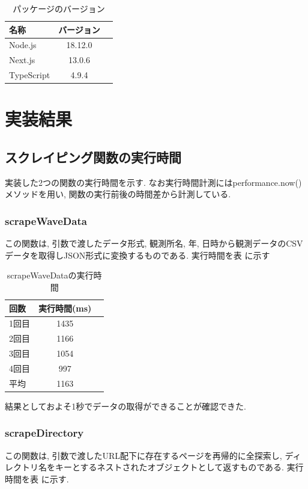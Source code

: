 \begin{table}[hbtp]
	\caption{パッケージのバージョン}
	\label{table:data_type}
	\centering
	\begin{tabular}{lcr}
		\hline
		名称         & バージョン   \\
		\hline \hline
		Node.js    & 18.12.0 \\
		Next.js    & 13.0.6  \\
		TypeScript & 4.9.4   \\
		
		\hline
	\end{tabular}
\end{table}


\section{実装結果}
\subsection{スクレイピング関数の実行時間}
実装した2つの関数の実行時間を示す.
なお実行時間計測にはperformance.now()メソッドを用い, 関数の実行前後の時間差から計測している.

\subsubsection{scrapeWaveData}
この関数は, 引数で渡したデータ形式, 観測所名, 年, 日時から観測データのCSVデータを取得しJSON形式に変換するものである.
実行時間を表 に示す

\begin{table}[hbtp]
	\caption{scrapeWaveDataの実行時間}
	\label{table:data_type}
	\centering
	\begin{tabular}{lcr}
		\hline
		回数  & 実行時間(ms) \\
		\hline \hline
		1回目 & 1435     \\
		2回目 & 1166     \\
		3回目 & 1054     \\
		4回目 & 997      \\
		\hline
		平均  & 1163
	\end{tabular}
\end{table}

結果としておよそ1秒でデータの取得ができることが確認できた.

\subsubsection{scrapeDirectory}
この関数は, 引数で渡したURL配下に存在するページを再帰的に全探索し, ディレクトリ名をキーとするネストされたオブジェクトとして返すものである.
実行時間を表 に示す.


